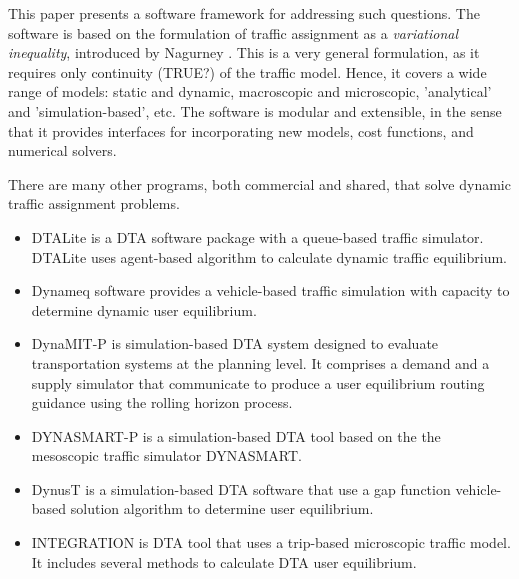This paper presents a software framework for addressing such questions. The software is based on the formulation of traffic assignment as a \textit{variational inequality}, introduced by Nagurney \cite{nagurney2013network}. This is a very general formulation, as it requires only continuity (\XXX TRUE?) of the traffic model. Hence, it covers a wide range of models: static and dynamic, macroscopic and microscopic, 'analytical' and 'simulation-based', etc. The software is modular and extensible, in the sense that it provides interfaces for incorporating new models, cost functions, and numerical solvers. 

There are many other programs, both commercial and shared, that solve dynamic traffic assignment problems. 



\begin{itemize}
\item DTALite \cite{zhou2014dtalite} is a DTA software package with a queue-based traffic simulator. DTALite uses agent-based algorithm to calculate dynamic traffic equilibrium.
\item Dynameq \cite{mahut2010traffic} software provides a vehicle-based traffic simulation with capacity to determine dynamic user equilibrium.  
\item DynaMIT-P \cite{DynaMIT,ben2001dynamit} is simulation-based DTA system designed to evaluate transportation
systems at the planning level. It comprises a demand and a supply simulator that communicate to produce a user equilibrium routing guidance using the rolling horizon process. 
\item DYNASMART-P \cite{DYNASMART,mahmassani2004dynasmart} is a simulation-based DTA tool based on the the mesoscopic traffic simulator DYNASMART. 
\item DynusT \cite{chiu2011dynust} is a simulation-based DTA software that use a gap function vehicle-based solution algorithm to determine user equilibrium.
\item INTEGRATION \cite{rakha2012integration} is DTA tool that uses a trip-based microscopic traffic model. It includes several methods to calculate DTA user equilibrium. 

\end{itemize}

